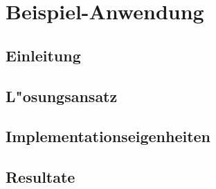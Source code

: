 \chapter{Beispiel-Anwendung}
\begin{refsection}

\section{Einleitung}
\section{L"osungsansatz}
\section{Implementationseigenheiten}
\section{Resultate}

\printbibliography[heading=subbibliography]
\end{refsection}
